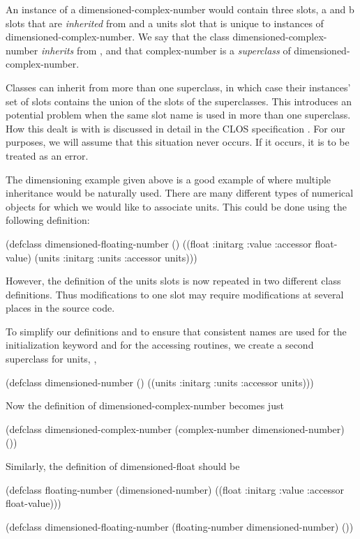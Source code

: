 \noindent
An instance of a {\sf dimensioned-complex-number} would contain three
slots, {\sf a} and {\sf b} slots that are {\em inherited} from
 and a {\sf units} slot that is unique to
instances of {\sf dimensioned-complex-number}.  We say that the class
{\sf dimensioned-complex-number} {\em inherits} from
, and that {\sf complex-number} is a {\em
superclass} of {\sf dimensioned-complex-number}.

Classes can inherit from more than one superclass, in which case their
instances' set of slots contains the union of the slots of the
superclasses.  This introduces an potential problem when the same slot
name is used in more than one superclass.  How this dealt is with is
discussed in detail in the CLOS specification \cite{CLOS:Manual}.  For
our purposes, we will assume that this situation never occurs.  If it
occurs, it is to be treated as an error.

The dimensioning example given above is a good example of where
multiple inheritance would be naturally used.  There are many
different types of numerical objects for which we would like to
associate units.  This could be done using the
following definition: 
  
\begin{code}
(defclass dimensioned-floating-number ()
  ((float :initarg :value :accessor float-value)
   (units :initarg :units :accessor units)))
\end{code}

\noindent
However, the definition of the {\sf units} slots is now repeated in
two different class definitions. Thus modifications to one slot may
require modifications at several places in the source code.

To simplify our definitions and to ensure that consistent names are
used for the initialization keyword and for the accessing routines, we
create a second superclass for units, \viz,
\begin{code}
(defclass dimensioned-number ()
  ((units :initarg :units :accessor units)))
\end{code}

\noindent
Now the definition of {\sf dimensioned-complex-number} becomes just
\begin{code}
(defclass dimensioned-complex-number (complex-number dimensioned-number)
  ())
\end{code}

Similarly, the definition of {\sf dimensioned-float} should be
\begin{code}
(defclass floating-number (dimensioned-number)
  ((float :initarg :value :accessor float-value)))

(defclass dimensioned-floating-number 
    (floating-number dimensioned-number)
  ())
\end{code}
  
